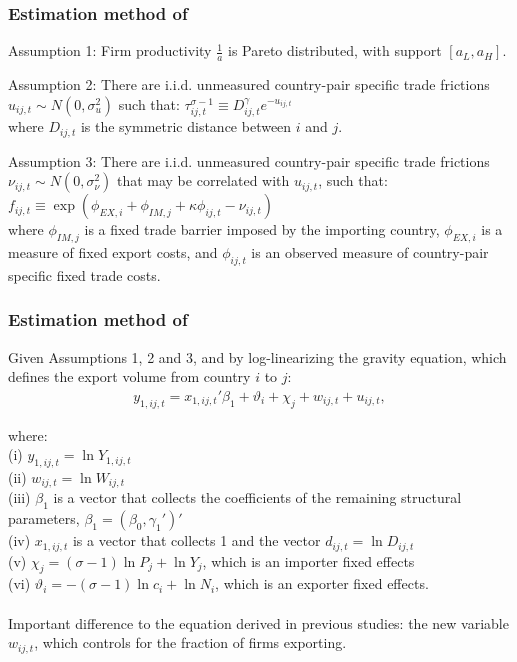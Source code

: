   \begin{frame}
    \frametitle{Estimation method of \cite{helpman2008estimating}}
    \begin{block}{Assumption 1:}
      Firm productivity $\frac{1}{a}$ is Pareto distributed, with support $[a_L,a_H]$.
    \end{block} 
    \begin{block}{Assumption 2:}
        There are i.i.d. unmeasured country-pair specific trade frictions $u_{ij,t} \sim N(0, \sigma_u^2)$ such that: $\tau_{i j,t}^{\sigma-1} \equiv D_{i j,t}^{\gamma} e^{-u_{i j,t}} $ \\
    where $D_{ij,t}$ is the symmetric distance between $i$ and $j$. 
      \end{block} 
      \begin{block}{Assumption 3:}
        There are i.i.d. unmeasured country-pair specific trade frictions $\nu_{ij,t}\sim N(0, \sigma_\nu^2)$ that may be correlated with $u_{ij,t}$, such that: $f_{i j,t} \equiv \exp \left(\phi_{E X, i}+\phi_{I M, j}+\kappa \phi_{i j,t}-\nu_{i j,t}\right)$ \\
        where $\phi_{I M, j}$ is a fixed trade barrier imposed by the importing country, $\phi_{E X, i}$ is a measure of fixed export costs, and $\phi_{i j,t}$ is an observed measure of country-pair specific fixed trade costs.
      \end{block} 
  \end{frame}

  \begin{frame}
    \frametitle{Estimation method of \cite{helpman2008estimating}}
    Given Assumptions 1, 2 and 3, and by log-linearizing the gravity equation, which defines the export volume from country $i$ to $j$:
\begin{align}
    y_{1,ij,t} = x_{1,ij,t}'\beta_1 + \vartheta_i + \chi_j + w_{ij,t} + u_{ij,t},
    \label{eq:est_MHR_wage}
\end{align}

\noindent where: \\
(i) $y_{1,ij,t} = \ln Y_{1,ij,t}$ \\
(ii) $w_{ij,t} = \ln W_{ij,t}$ \\
(iii) $\beta_1$ is a vector that collects the coefficients of the remaining structural parameters, $\beta_1 = (\beta_0, \gamma_1')'$\\
(iv) $x_{1,ij,t}$ is a vector that collects 1 and the vector $ d_{ij,t} = \ln D_{ij,t}$\\
(v) $\chi_j = (\sigma -1) \ln P_j + \ln Y_j$, which is an importer fixed effects\\
(vi) $\vartheta_i = -(\sigma - 1) \ln c_i + \ln N_i$, which is an exporter fixed effects.
\\~\\
Important difference to the equation derived in previous studies: the new variable $w_{ij,t}$, which controls for the fraction of firms exporting. 
  \end{frame}

